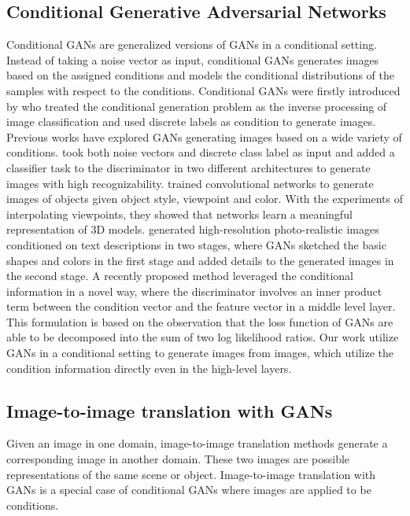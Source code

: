 \subsection{Conditional Generative Adversarial Networks}
Conditional GANs are generalized versions of GANs in a conditional setting. Instead of taking a noise vector as input, conditional GANs generates images based on the assigned conditions and models the conditional distributions of the samples with respect to the conditions. 
Conditional GANs were firstly introduced by \cite{cGANs} who treated the conditional generation problem as the inverse processing of image classification and used discrete labels as condition to generate images. Previous works have explored GANs generating images based on a wide variety of conditions.
\cite{InfoGANs, ACGANs} took both noise vectors and discrete class label as input and added a classifier task to the discriminator in two different architectures to generate images with high recognizability.   
%
\cite{3DGANs} trained convolutional networks to generate images of objects given object style, viewpoint and color. With the experiments of interpolating viewpoints, they showed that networks learn a meaningful representation of 3D models. 
%
\cite{StackGANs, StackGANs++} generated high-resolution photo-realistic images conditioned on text descriptions in two stages, where GANs sketched the basic shapes and colors in the first stage and added details to the generated images in the second stage.  
%
A recently proposed method\cite{cGAN-projection} leveraged the conditional information in a novel way, where the discriminator involves an inner product term between the condition vector and the feature vector in a middle level layer. This formulation is based on the observation that the loss function of GANs are able to be decomposed into the sum of two log likelihood ratios.
%
Our work utilize GANs in a conditional setting to generate images from images, which utilize the condition information directly even in the high-level layers.
%
%
\subsection{Image-to-image translation with GANs}
Given an image in one domain, image-to-image translation methods generate a corresponding image in another domain. These two images are possible representations of the same scene or object. Image-to-image translation with GANs is a special case of conditional GANs where images are applied to be conditions. 
%


